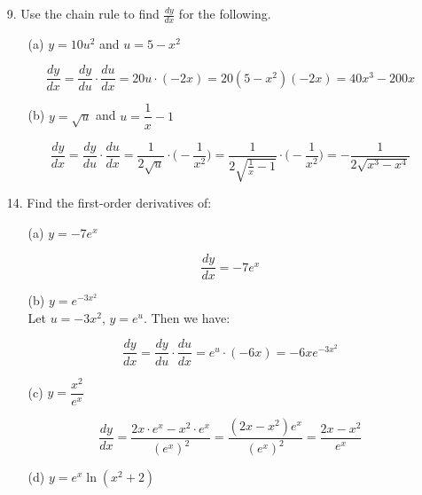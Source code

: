 \documentclass{article}
\begin{document}
\begin{enumerate}
\begin{enumerate}
        \end{enumerate}
        
        
    \item[9.] Use the chain rule to find $\frac{dy}{dx}$ for the following.
    
        \begin{enumerate}
            
            \item[(a)] $ y = 10u^2 $ and $ u = 5 - x^2 $
            
            $$ \frac{dy}{dx} = \frac{dy}{du} \cdot \frac{du}{dx} = 20u \cdot (-2x) = 20( 5 - x^2 )(-2x) = 40x^3-200x $$
            
            \item[(b)] $ y = \sqrt{u} $ and $ u = \dfrac{1}{x} - 1 $
            
            $$ \frac{dy}{dx} = \frac{dy}{du} \cdot \frac{du}{dx} = \frac{1}{2\sqrt{u}} \cdot \Big( -\frac{1}{x^2} \Big) = \frac{1}{2\sqrt{\frac{1}{x} - 1}} \cdot \Big( -\frac{1}{x^2} \Big) = -\frac{1}{2\sqrt{ x^3 - x^4 }} $$
            
        \end{enumerate}
    
    
    \item[14.] Find the first-order derivatives of:
    
        \begin{enumerate}
            
            \item[(a)] $ y = -7e^x $
            
            $$ \frac{dy}{dx} =  -7e^x $$
            
            \item[(b)] $ y = e^{-3x^2} $ \\
            
            Let $ u = -3x^2 $, $ y = e^u $. Then we have:
            
            $$ \frac{dy}{dx} = \frac{dy}{du} \cdot \frac{du}{dx} = e^u \cdot (-6x) = -6x e^{-3x^2} $$
            
            \item[(c)] $ y = \dfrac{x^2}{e^x} $
            
            $$ \frac{dy}{dx} = \frac{ 2x \cdot e^x - x^2 \cdot e^x }{ (e^x)^2 } = \frac{ (2x-x^2)e^x }{ (e^x)^2 } = \frac{ 2x-x^2 }{ e^x } $$
            
            \item[(d)] $ y = e^x \ln{ (x^2 + 2) } $ \\
            

\end{enumerate}
\end{enumerate}
\end{document}
